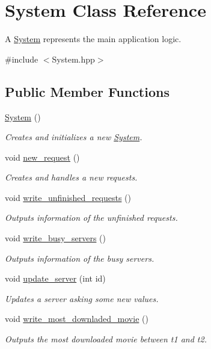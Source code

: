 \hypertarget{class_system}{\section{System Class Reference}
\label{d9/d16/class_system}
}


A \hyperlink{class_system}{System} represents the main application logic.  




{\ttfamily \#include $<$System.\-hpp$>$}

\subsection*{Public Member Functions}
\begin{DoxyCompactItemize}
\item 
\hyperlink{class_system_ae317936c9bcf1374d61745572e0f2f8a}{System} ()
\begin{DoxyCompactList}\small\item\em Creates and initializes a new \hyperlink{class_system}{System}. \end{DoxyCompactList}\item 
void \hyperlink{class_system_a499965423e9e68d34f3e990bad6df6e4}{new\-\_\-request} ()
\begin{DoxyCompactList}\small\item\em Creates and handles a new requests. \end{DoxyCompactList}\item 
void \hyperlink{class_system_add52fcf8832657bed30a4e7685a4945e}{write\-\_\-unfinished\-\_\-requests} ()
\begin{DoxyCompactList}\small\item\em Outputs information of the unfinished requests. \end{DoxyCompactList}\item 
void \hyperlink{class_system_a44fbbdfc460ec7234471da2e6ad83826}{write\-\_\-busy\-\_\-servers} ()
\begin{DoxyCompactList}\small\item\em Outputs information of the busy servers. \end{DoxyCompactList}\item 
void \hyperlink{class_system_a42515d345b69287ff126025a75e1654f}{update\-\_\-server} (int id)
\begin{DoxyCompactList}\small\item\em Updates a server asking some new values. \end{DoxyCompactList}\item 
void \hyperlink{class_system_a77a40e3668db7126501e58a724279f71}{write\-\_\-most\-\_\-downladed\-\_\-movie} ()
\begin{DoxyCompactList}\small\item\em Outputs the most downloaded movie between t1 and t2. \end{DoxyCompactList}\end{DoxyCompactItemize}


